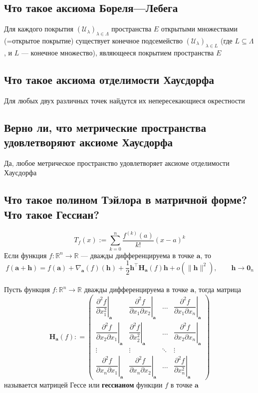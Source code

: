 \documentclass[a4paper]{article}
\newcommand{\m}[1]{\mathbf{#1}}
\begin{document}
\subsection{Что такое аксиома Бореля—Лебега}
Для каждого покрытия $(\mathscr{U}_\lambda)_{\lambda \in \Lambda}$ пространства $E$ открытыми множествами (=открытое покрытие) существует конечное подсемейство $(\mathscr{U}_\lambda)_{\lambda \in L}$ (где $L \subseteq \Lambda$, и $L$ — конечное множество), являющееся покрытием пространства $E$

\subsection{Что такое аксиома отделимости Хаусдорфа}
Для любых двух различных точек найдутся их непересекающиеся окрестности

\subsection{Верно ли, что метрические пространства удовлетворяют аксиоме Хаусдорфа}
Да, любое метрическое пространство удовлетворяет аксиоме отделимости Хаусдорфа

\subsection{Что такое полином Тэйлора в матричной форме? Что такое Гессиан?}
$$T_f(x):=\sum_{k=0}^n \frac{f^{(k)}(a)}{k !}(x-a)^k$$
Если функция $f:\mathbb{R}^n \to \mathbb{R}$ — дважды дифференцируема в точке $\m{a}$, то
$$
f(\m{a} + \m{h}) =f(\m{a}) + \nabla_\m{a}(f)(\m{h}) + \frac{1}{2} \m{h}^\top \m{H}_\m{a}(f) \m{h} + o(\|\m{h}\|^2), \qquad \m{h} \to \m{0}_n
$$\\[2mm]
Пусть функция $f:\mathbb{R}^n \to \mathbb{R}$ дважды дифференцируема в точке $\m{a}$, тогда матрица
$$
\m{H}_\m{a}(f): = \begin{pmatrix}
\left.\dfrac{\partial^2 f}{\partial x_1^2}\right|_{\m{a}} & \left.\dfrac{\partial^2 f}{\partial x_1 \partial x_2}\right|_{\m{a}} &\ldots & \left.\dfrac{\partial^2 f}{\partial x_1 \partial x_n}\right|_{\m{a}} \\
\left.\dfrac{\partial^2 f}{\partial x_2 \partial x_1}\right|_{\m{a}} & \left.\dfrac{\partial^2 f}{\partial x_2^2}\right|_{\m{a}} & \ldots & \left.\dfrac{\partial^2 f}{\partial x_2 \partial x_n}\right|_{\m{a}} \\
\vdots & \vdots & \ddots & \vdots \\
\left.\dfrac{\partial^2 f}{\partial x_n \partial x_1}\right|_{\m{a}} & \left.\dfrac{\partial^2 f}{\partial x_n \partial x_2}\right|_{\m{a}} & \ldots &\left.\dfrac{\partial^2 f}{ \partial x_n^2}\right|_{\m{a}}
\end{pmatrix}
$$
называется матрицей Гессе или \textbf{гессианом} функции $f$ в точке $\m{a}$
\end{document}
